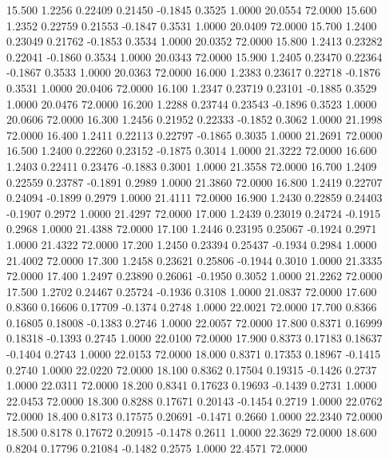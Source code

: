   15.500   1.2256   0.22409   0.21450  -0.1845   0.3525   1.0000  20.0554  72.0000
  15.600   1.2352   0.22759   0.21553  -0.1847   0.3531   1.0000  20.0409  72.0000
  15.700   1.2400   0.23049   0.21762  -0.1853   0.3534   1.0000  20.0352  72.0000
  15.800   1.2413   0.23282   0.22041  -0.1860   0.3534   1.0000  20.0343  72.0000
  15.900   1.2405   0.23470   0.22364  -0.1867   0.3533   1.0000  20.0363  72.0000
  16.000   1.2383   0.23617   0.22718  -0.1876   0.3531   1.0000  20.0406  72.0000
  16.100   1.2347   0.23719   0.23101  -0.1885   0.3529   1.0000  20.0476  72.0000
  16.200   1.2288   0.23744   0.23543  -0.1896   0.3523   1.0000  20.0606  72.0000
  16.300   1.2456   0.21952   0.22333  -0.1852   0.3062   1.0000  21.1998  72.0000
  16.400   1.2411   0.22113   0.22797  -0.1865   0.3035   1.0000  21.2691  72.0000
  16.500   1.2400   0.22260   0.23152  -0.1875   0.3014   1.0000  21.3222  72.0000
  16.600   1.2403   0.22411   0.23476  -0.1883   0.3001   1.0000  21.3558  72.0000
  16.700   1.2409   0.22559   0.23787  -0.1891   0.2989   1.0000  21.3860  72.0000
  16.800   1.2419   0.22707   0.24094  -0.1899   0.2979   1.0000  21.4111  72.0000
  16.900   1.2430   0.22859   0.24403  -0.1907   0.2972   1.0000  21.4297  72.0000
  17.000   1.2439   0.23019   0.24724  -0.1915   0.2968   1.0000  21.4388  72.0000
  17.100   1.2446   0.23195   0.25067  -0.1924   0.2971   1.0000  21.4322  72.0000
  17.200   1.2450   0.23394   0.25437  -0.1934   0.2984   1.0000  21.4002  72.0000
  17.300   1.2458   0.23621   0.25806  -0.1944   0.3010   1.0000  21.3335  72.0000
  17.400   1.2497   0.23890   0.26061  -0.1950   0.3052   1.0000  21.2262  72.0000
  17.500   1.2702   0.24467   0.25724  -0.1936   0.3108   1.0000  21.0837  72.0000
  17.600   0.8360   0.16606   0.17709  -0.1374   0.2748   1.0000  22.0021  72.0000
  17.700   0.8366   0.16805   0.18008  -0.1383   0.2746   1.0000  22.0057  72.0000
  17.800   0.8371   0.16999   0.18318  -0.1393   0.2745   1.0000  22.0100  72.0000
  17.900   0.8373   0.17183   0.18637  -0.1404   0.2743   1.0000  22.0153  72.0000
  18.000   0.8371   0.17353   0.18967  -0.1415   0.2740   1.0000  22.0220  72.0000
  18.100   0.8362   0.17504   0.19315  -0.1426   0.2737   1.0000  22.0311  72.0000
  18.200   0.8341   0.17623   0.19693  -0.1439   0.2731   1.0000  22.0453  72.0000
  18.300   0.8288   0.17671   0.20143  -0.1454   0.2719   1.0000  22.0762  72.0000
  18.400   0.8173   0.17575   0.20691  -0.1471   0.2660   1.0000  22.2340  72.0000
  18.500   0.8178   0.17672   0.20915  -0.1478   0.2611   1.0000  22.3629  72.0000
  18.600   0.8204   0.17796   0.21084  -0.1482   0.2575   1.0000  22.4571  72.0000
